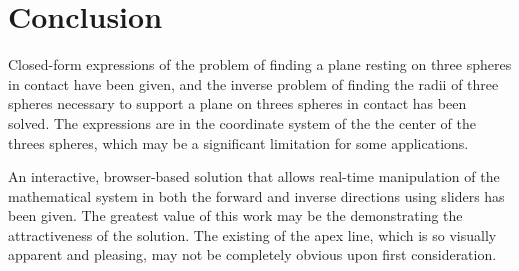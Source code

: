 \documentclass{article}
\begin{document}
\section{Conclusion}

Closed-form expressions of the problem of finding a plane resting on
three spheres in contact have been given, and the inverse problem
of finding the radii of three spheres necessary to support a plane
on threes spheres in contact has been solved.
The expressions are in the coordinate system of the the center
of the threes spheres, which may be a significant limitation for some
applications.

An interactive, browser-based solution that allows real-time manipulation
of the mathematical system in both the forward and inverse directions
using sliders has been given\cite{softrobotcalc}. The greatest value of this work
may be the demonstrating the attractiveness of the solution.
The existing of the apex line, which is so visually apparent and pleasing,
may not be completely obvious upon first consideration.

\printbibliography
\end{document}
